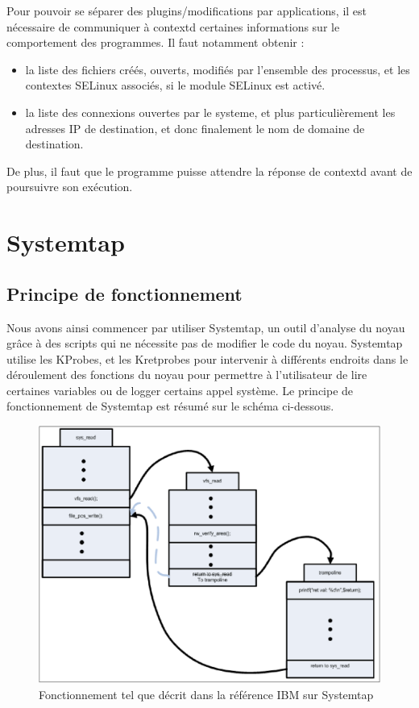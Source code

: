 \documentclass[pdftex,a4paper,titlepage,11pt,openright]{article}
\begin{document}
Pour pouvoir se séparer des plugins/modifications par applications, il est nécessaire de communiquer à contextd certaines informations sur le comportement des programmes. Il faut notamment obtenir :
\begin{itemize}
	\item la liste des fichiers créés, ouverts, modifiés par l'ensemble des processus, et les contextes SELinux associés, si le module SELinux est activé.
	\item la liste des connexions ouvertes par le systeme, et plus particulièrement les adresses IP de destination, et donc finalement le nom de domaine de destination.\\
\end{itemize}

De plus, il faut que le programme puisse attendre la réponse de contextd avant de poursuivre son exécution.

\section{Systemtap}

\subsection{Principe de fonctionnement}

Nous avons ainsi commencer par utiliser Systemtap, un outil d'analyse du noyau grâce à des scripts qui ne nécessite pas de modifier le code du noyau. Systemtap utilise les KProbes, et les Kretprobes\cite{IBMRBST} pour intervenir à différents endroits dans le déroulement des fonctions du noyau pour permettre à l'utilisateur de lire certaines variables ou de logger certains appel système. Le principe de fonctionnement de Systemtap est résumé sur le schéma ci-dessous.
\begin{figure}[hb]
	\centering
	\includegraphics[scale=0.4]{kretprob.png}
	\caption{Fonctionnement tel que décrit dans la référence IBM sur Systemtap \cite{IBMRBST}}
\end{figure}
\end{document}
